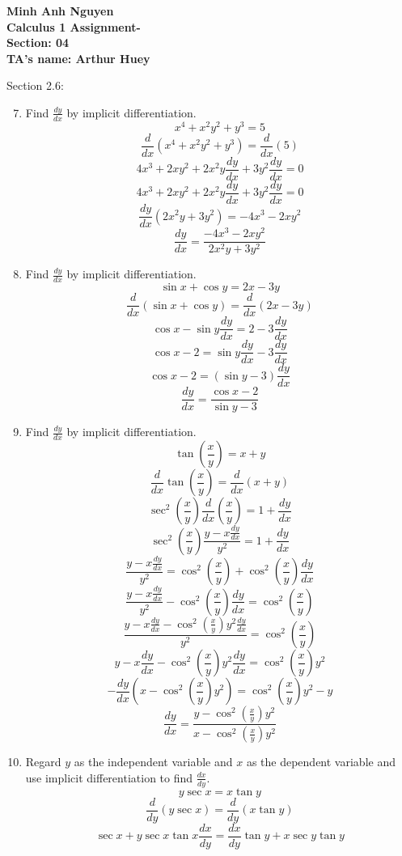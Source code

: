 \documentclass[12pt]{article}
\begin{document}
\textbf{Minh Anh Nguyen }\\
\textbf{Calculus 1 Assignment-}\\
\textbf{Section: 04}\\
\textbf{TA's name: Arthur Huey}

\hrulefill


Section 2.6:

\begin{enumerate}
    \setcounter{enumi}{6}
    \item Find $\frac{dy}{dx}$ by implicit differentiation.
    \[x^4 + x^2 y^2 + y^3 = 5 \]
    \[\frac{d}{dx}(x^4 + x^2 y^2 + y^3) = \frac{d}{dx}(5)\]
    \[4x^3 + 2xy^2 + 2x^2y\frac{dy}{dx} + 3y^2 \frac{dy}{dx} = 0\]
    \[4x^3 + 2xy^2 + 2x^2y\frac{dy}{dx} + 3y^2 \frac{dy}{dx} = 0\]
    \[\frac{dy}{dx}(2x^2y + 3y^2) = -4x^3 - 2xy^2\]
    \[\boxed{\frac{dy}{dx} = \frac{-4x^3 - 2xy^2}{2x^2y + 3y^2}}\]
    \setcounter{enumi}{10}
    \item Find $\frac{dy}{dx}$ by implicit differentiation.
    \[\sin x + \cos y = 2x - 3y\]
    \[\frac{d}{dx}(\sin x + \cos y) = \frac{d}{dx}(2x - 3y)\]
    \[\cos x - \sin y  \frac{dy}{dx} = 2 - 3\frac{dy}{dx}\]
    \[\cos x - 2 = \sin y  \frac{dy}{dx} - 3\frac{dy}{dx}\]
    \[\cos x - 2 = (\sin y - 3)\frac{dy}{dx}\]
    \[\boxed{\frac{dy}{dx} = \frac{\cos x - 2}{\sin y - 3}}\]
    \setcounter{enumi}{14}
    \item Find $\frac{dy}{dx}$ by implicit differentiation.
    \[\tan(\frac{x}{y}) = x + y\]
    \[\frac{d}{dx}\tan(\frac{x}{y}) = \frac{d}{dx}(x + y)\]
    \[\sec^2(\frac{x}{y}) \frac{d}{dx}(\frac{x}{y}) = 1 + \frac{dy}{dx}\]
    \[\sec^2(\frac{x}{y}) \frac{y - x\frac{dy}{dx}}{y^2} = 1 + \frac{dy}{dx}\]
    \[ \frac{y - x\frac{dy}{dx}}{y^2} = \cos^2(\frac{x}{y}) + \cos^2(\frac{x}{y})\frac{dy}{dx}\]
    \[ \frac{y - x\frac{dy}{dx}}{y^2} - \cos^2(\frac{x}{y})\frac{dy}{dx}= \cos^2(\frac{x}{y})\]
    \[ \frac{y - x\frac{dy}{dx}- \cos^2(\frac{x}{y})y^2\frac{dy}{dx}}{y^2} = \cos^2(\frac{x}{y})\]
    \[ y - x\frac{dy}{dx}- \cos^2(\frac{x}{y})y^2\frac{dy}{dx} = \cos^2(\frac{x}{y})y^2\]
    \[ - \frac{dy}{dx}(x- \cos^2(\frac{x}{y})y^2) = \cos^2(\frac{x}{y})y^2 - y\]
    \[ \boxed{\frac{dy}{dx} = \frac{y - \cos^2(\frac{x}{y})y^2}{x- \cos^2(\frac{x}{y})y^2}}\]
    \setcounter{enumi}{23}
    \item Regard $y$ as the independent variable and $x$ as the dependent variable and use implicit differentiation to find $\frac{dx}{dy}$.
    \[y\sec x = x \tan y\]
    \[\frac{d}{dy}(y\sec x) = \frac{d}{dy}(x \tan y)\]
    \[\sec x + y \sec x \tan x \frac{dx}{dy} = \frac{dx}{dy} \tan y + x \sec y \tan y\]

\end{enumerate}
\end{document}

